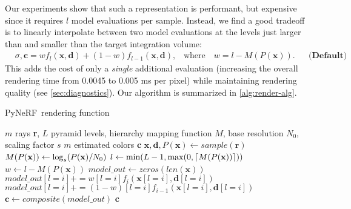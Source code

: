 \documentclass{article}
\newcommand{\method}{PyNeRF\xspace}
\DeclarePairedDelimiter{\ceil}{\lceil}{\rceil}
\begin{document}
Our experiments show that such a representation is performant, but expensive since it requires $l$ model evaluations per sample. Instead, we find a good tradeoff is to linearly interpolate between two model evaluations at the levels
just larger than and smaller than the target integration volume:
\begin{align}
      & \sigma, \mathbf{c} = w f_l(\mathbf{x,d}) + (1-w)f_{l-1} (\mathbf{x,d}) \text{,} \quad \text{where} \quad w = l - M(P(\mathbf{x})). && \textbf{(Default) [PyNeRF]} 
\label{eq:default-eq}
\end{align}
This adds the cost of only a \emph{single} additional evaluation (increasing the overall rendering time from 0.0045 to 0.005 ms per pixel) while maintaining rendering quality (see \cref{sec:diagnostics}). Our algorithm is summarized in \cref{alg:render-alg}.

\begin{algorithm}[t!]
\caption{\method\ rendering function}\label{alg:render-alg}
\begin{algorithmic}
\Require $m$ rays \textbf{r}, $L$ pyramid levels, hierarchy mapping function $M$, base resolution $N_0$, scaling factor $s$
\Ensure $m$ estimated colors \textbf{c}
\State $\textbf{x}, \textbf{d}, P(\textbf{x}) \gets sample(\textbf{r})$  
\State $M(P(\mathbf{x})) \gets \log_s(P({\bf x})/N_0)$ 
\State $l \gets \min(L-1, \max(0, \ceil{M(P(\mathbf{x}))}))$ 
\State $w \gets l - M(P(\mathbf{x}))$ 
\State $model\_out \gets zeros(len(\textbf{x}))$ 
 
    \State $model\_out[l = i] \mathrel{{+}{=}} w[l = i]f_i(\textbf{x}[l = i], \textbf{d}[l = i])$
    \State $model\_out[l = i] \mathrel{{+}{=}} (1 - w)[l = i]f_{i-1}(\textbf{x}[l = i], \textbf{d}[l = i])$ 
\EndFor
\State $\textbf{c} \gets composite(model\_out)$ 
\State \Return \textbf{c}
\end{algorithmic}
\end{algorithm}
\end{document}
